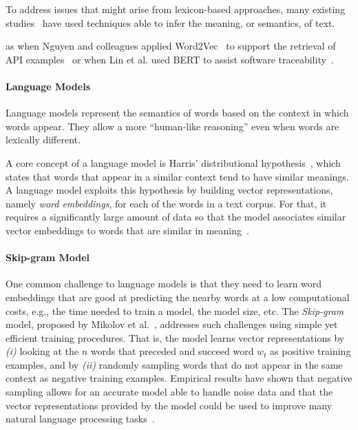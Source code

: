 To address issues that might arise from lexicon-based approaches,
many existing studies~\cite{silva2019, Huang2018, Ye2016, huang2018automating} have used techniques able to infer the meaning, or semantics, of text. 



 as  when Nguyen and colleagues
applied Word2Vec~\cite{Mikolov2013} to support the retrieval of API
examples~\cite{nguyen2017} or when Lin et al. used BERT to assist software traceability~\cite{Lin2021}.



\paragraph{\textbf{Language Models}}

Language models represent the semantics of words based on the context in which words appear. They allow a more ``human-like reasoning'' even when words are lexically different. 


A core concept of a language model is Harris' distributional hypothesis~\cite{harris1954distributional}, which states that words that appear in a similar context tend to have similar meanings. A language model exploits this hypothesis by building vector representations, namely \textit{word embeddings}, for each of the words in a text corpus.
For that, it requires a significantly large amount of data so that
the model associates similar vector embeddings to words that are similar in meaning~\cite{Ye2016}. 





\paragraph{\textbf{Skip-gram Model}}
\label{cp5:skip-gram}

One common challenge to language models is that they need to learn word embeddings that are good at predicting the nearby words at a low computational costs, e.g., the time needed to train a model, the model size, etc.
The \textit{Skip-gram} model, proposed by Mikolov et al.~\cite{Mikolov2013}, addresses such challenges using simple yet efficient training procedures. 
That is, the model learns vector representations by \textit{(i)} looking at the $n$ words that preceded and succeed word $w_t$
as positive training examples, and by \textit{(ii)} randomly sampling words that do not appear in the same context as negative training examples. 
Empirical results have shown that negative sampling allows for an accurate model able to handle noise data and that 
the vector representations provided by the model could be used to improve many natural language processing tasks~\cite{mikolov2013efficient}.


